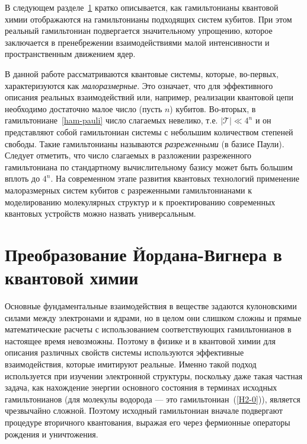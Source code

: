 \documentclass[a4paper]{report}
\begin{document}
В следующем разделе~\ref{JW-sec} кратко описывается, как гамильтонианы квантовой химии отображаются на гамильтонианы подходящих систем кубитов. При этом реальный гамильтониан подвергается значительному упрощению, которое заключается в пренебрежении взаимодействиями малой интенсивности и пространственным движением ядер.

В данной работе рассматриваются квантовые системы, которые, во-первых, характеризуются как \textit{малоразмерные}. Это означает, что для эффективного описания реальных взаимодействий или, например, реализации квантовой цепи необходимо достаточно малое число (пусть $n$) кубитов. Во-вторых, в гамильтониане~\ref{ham-pauli} число слагаемых невелико, т.е. $|\mathcal{T}|\ll4^n$ и он представляют собой гамильтониан системы с небольшим количеством степеней свободы. Такие гамильтонианы называются \textit{разреженными} (в базисе Паули). Следует отметить, что число слагаемых в разложении разреженного гамильтониана по стандартному вычислительному базису может быть большим вплоть до $4^n$. На современном этапе развития квантовых технологий применение малоразмерных систем кубитов с разреженными гамильтонианами к моделированию молекулярных структур и к проектированию современных квантовых устройств можно назвать универсальным.



\section{Преобразование Йордана-Вигнера в\\ квантовой химии}
\label{JW-sec}

Основные фундаментальные взаимодействия в веществе задаются кулоновскими силами между электронами и ядрами, но в целом они слишком сложны и прямые математические расчеты с использованием соответствующих гамильтонианов в настоящее время невозможны. Поэтому в физике и в квантовой химии для описания различных свойств системы используются эффективные взаимодействия, которые имитируют реальные. Именно такой подход используется при изучении электронной структуры, поскольку даже такая частная задача, как нахождение энергии основного состояния  в терминах исходных гамильтонианов (для молекулы водорода --- это гамильтониан~(\ref{H2-0})), является чрезвычайно сложной. Поэтому исходный гамильтониан вначале подвергают процедуре вторичного квантования, выражая его через фермионные операторы рождения и уничтожения.
\end{document}
